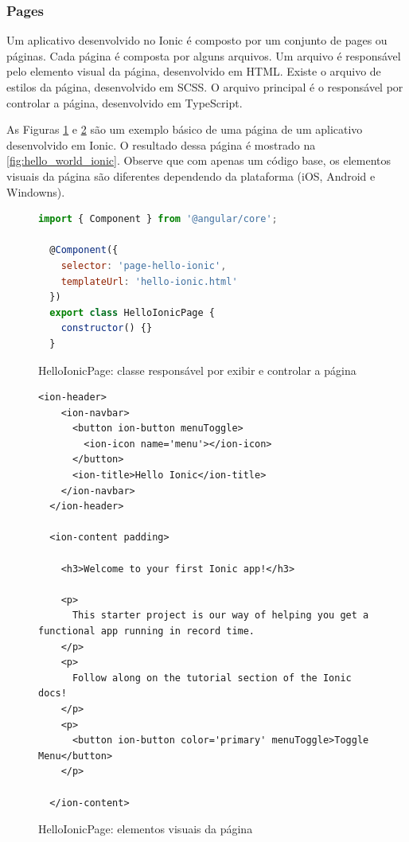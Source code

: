 \subsubsection{Pages}

Um aplicativo desenvolvido no Ionic é composto por um conjunto de pages ou páginas.
Cada página é composta por alguns arquivos. Um arquivo é responsável pelo
elemento visual da página, desenvolvido em HTML. Existe o arquivo de estilos da página,
desenvolvido em SCSS. O arquivo principal é o responsável por controlar a página, desenvolvido
em TypeScript.

As Figuras \ref{fig:hello_ionic_ts} e \ref{fig:hello_ionic_html} são um exemplo básico de
uma página de um aplicativo desenvolvido em Ionic. O resultado dessa página é mostrado
na \autoref{fig:hello_world_ionic}. Observe que com apenas um código base, os elementos
visuais da página são diferentes dependendo da plataforma (iOS, Android e Windowns).

\begin{figure}[h]
\begin{lstlisting}[language=JavaScript]
  import { Component } from '@angular/core';

  @Component({
    selector: 'page-hello-ionic',
    templateUrl: 'hello-ionic.html'
  })
  export class HelloIonicPage {
    constructor() {}
  }
\end{lstlisting}
\caption{HelloIonicPage: classe responsável por exibir e controlar a página}
\label{fig:hello_ionic_ts}
\end{figure}

\begin{figure}[h]
\begin{lstlisting}[language=ionicHtml]
  <ion-header>
    <ion-navbar>
      <button ion-button menuToggle>
        <ion-icon name='menu'></ion-icon>
      </button>
      <ion-title>Hello Ionic</ion-title>
    </ion-navbar>
  </ion-header>

  <ion-content padding>

    <h3>Welcome to your first Ionic app!</h3>

    <p>
      This starter project is our way of helping you get a functional app running in record time.
    </p>
    <p>
      Follow along on the tutorial section of the Ionic docs!
    </p>
    <p>
      <button ion-button color='primary' menuToggle>Toggle Menu</button>
    </p>

  </ion-content>
\end{lstlisting}
\caption{HelloIonicPage: elementos visuais da página}
\label{fig:hello_ionic_html}
\end{figure}

